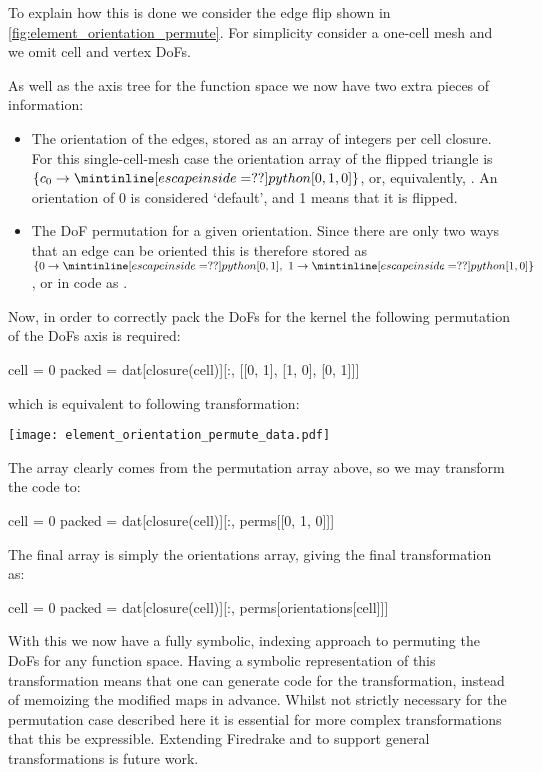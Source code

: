 \documentclass[thesis]{subfiles}
\begin{document}
To explain how this is done we consider the edge flip shown in \cref{fig:element_orientation_permute}.
For simplicity consider a one-cell mesh and we omit cell and vertex DoFs.

As well as the axis tree for the function space we now have two extra pieces of information:
\begin{itemize}
  \item
    The orientation of the edges, stored as an array of integers per cell closure.
    For this single-cell-mesh case the orientation array of the flipped triangle is $\{ c_0 \to \pycode{[0, 1, 0]} \}$, or, equivalently, .
    An orientation of 0 is considered `default', and 1 means that it is flipped.

  \item
    The DoF permutation for a given orientation.
    Since there are only two ways that an edge can be oriented this is therefore stored as $\{ 0 \to \pycode{[0, 1]},\ 1 \to \pycode{[1, 0]} \}$, or in code as .
\end{itemize}

Now, in order to correctly pack the DoFs for the kernel the following permutation of the DoFs axis is required:
\begin{pyinline}
  cell = 0
  packed = dat[closure(cell)][:, [[0, 1], [1, 0], [0, 1]]]
\end{pyinline}
which is equivalent to following transformation:
\begin{center}
  \texttt{[image: element\_orientation\_permute\_data.pdf]}
\end{center}

The array \pycode{[[0, 1], [1, 0], [0, 1]]} clearly comes from the permutation array above, so we may transform the code to:
\begin{pyinline}
  cell = 0
  packed = dat[closure(cell)][:, perms[[0, 1, 0]]]
\end{pyinline}
The final array \pycode{[0, 1, 0]} is simply the orientations array, giving the final transformation as:
\begin{pyinline}
  cell = 0
  packed = dat[closure(cell)][:, perms[orientations[cell]]]
\end{pyinline}

With this we now have a fully symbolic, indexing approach to permuting the DoFs for any function space.
Having a symbolic representation of this transformation means that one can generate code for the transformation, instead of memoizing the modified maps in advance.
Whilst not strictly necessary for the permutation case described here it is essential for more complex transformations that this be expressible.
Extending Firedrake and  to support general transformations is future work.
\end{document}
